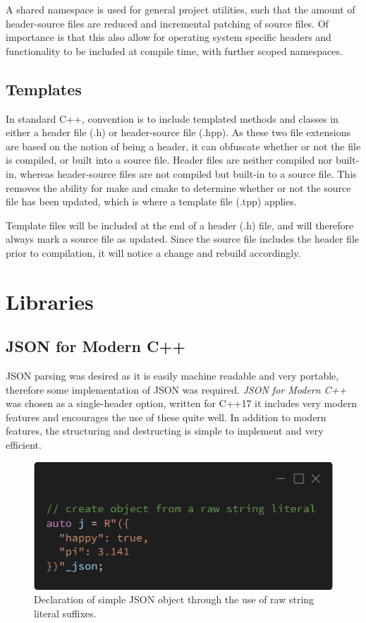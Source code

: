 \documentclass[conference]{IEEEtran}
\begin{document}
A shared namespace is used for general project utilities, such that the amount of header-source files are reduced and
incremental patching of source files. Of importance is that this also allow for operating system specific
headers and functionality to be included at compile time, with further scoped namespaces.

\subsection{Templates}
In standard C++, convention is to include templated methods and classes in either a header file (.h) or header-source file (.hpp).
As these two file extensions are based on the notion of being a header, it can obfuscate whether or not the file is compiled, or built into a source file.
Header files are neither compiled nor built-in, whereas header-source files are not compiled but built-in to a source file.
This removes the ability for make and cmake to determine whether or not the source file has been updated, which is where a template file (.tpp) applies.

Template files will be included at the end of a header (.h) file, and will therefore always mark a source file as updated.
Since the source file includes the header file prior to compilation, it will notice a change and rebuild accordingly.

\section{Libraries}

\subsection{JSON for Modern C++}
JSON parsing was desired as it is easily machine readable and very portable, therefore some implementation of JSON was required.
\textit{JSON for Modern C++} was chosen as a single-header option, written for C++17 it includes very modern features and encourages the use of these quite well.
In addition to modern features, the structuring and destructing is simple to implement and very efficient.

\begin{figure}[!t]
    \centering
    \includegraphics[width=\linewidth]{fig-json}
    \caption{Declaration of simple JSON object through the use of raw string literal suffixes.}
    \label{fig-json}
\end{figure}
\end{document}
